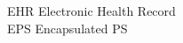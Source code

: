 \begin{tabbing}






    \>EHR \>\>Electronic Health Record\\













    \>EPS \>\>Encapsulated PS\\



\end{tabbing}
